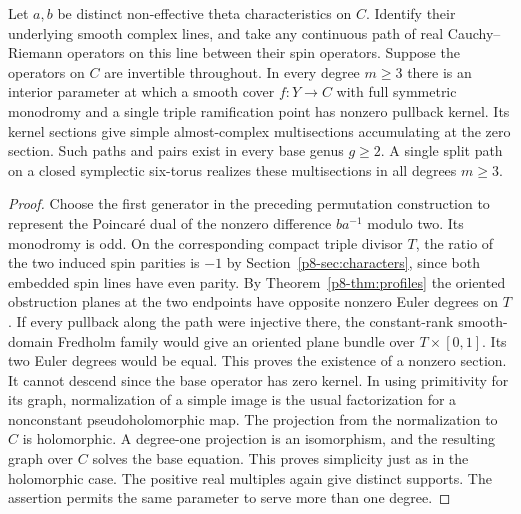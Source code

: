 \begin{theorem}\label{p8-thm:path-graphs}
Let $a,b$ be distinct non-effective theta characteristics on $C$.
Identify their underlying smooth complex lines, and take any
continuous path of real Cauchy--Riemann operators on this line
between their spin operators. Suppose the operators on $C$ are
invertible throughout. In every degree $m\ge3$ there is an interior
parameter at which a smooth cover $f:Y\to C$ with full symmetric
monodromy and a single triple ramification point has nonzero
pullback kernel. Its kernel sections give simple almost-complex
multisections accumulating at the zero section. Such paths and
pairs exist in every base genus $g\ge2$. A single split path on
a closed symplectic six-torus realizes these multisections in all
degrees $m\ge3$.
\end{theorem}
\begin{proof}
Choose the first generator in the preceding permutation construction
to represent the Poincar\'e dual of the nonzero difference $ba^{-1}$
modulo two. Its monodromy is odd. On the corresponding compact
triple divisor $T$, the ratio of the two induced spin parities is
$-1$ by Section~\ref{p8-sec:characters}, since both embedded spin lines
have even parity. By Theorem~\ref{p8-thm:profiles} the oriented
obstruction planes at the two endpoints have opposite nonzero Euler
degrees on $T$. If every pullback along the path were injective
there, the constant-rank smooth-domain Fredholm family would give
an oriented plane bundle over $T\times[0,1]$. Its two Euler degrees
would be equal. This proves the existence of a nonzero section.
It cannot descend since the base operator has zero kernel. In using
primitivity for its graph, normalization of a simple image is the
usual factorization for a nonconstant pseudoholomorphic map.
The projection from the normalization to $C$ is holomorphic.
A degree-one projection is an isomorphism, and the resulting graph
over $C$ solves the base equation. This proves simplicity just as
in the holomorphic case. The positive real multiples again give
distinct supports. The assertion permits the same parameter to
serve more than one degree.


\end{proof}
